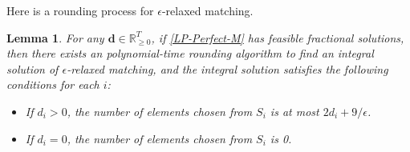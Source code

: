 \documentclass[11pt,a4paper]{article} \usepackage{enumitem}
\newcommand{\boldd}{\boldsymbol{d}}
\newtheorem{lemma}[theorem]{Lemma}
\theoremstyle{definition}
\begin{document}
Here is a rounding process for $\epsilon$-relaxed matching.

\begin{lemma} \label{lem:matching-2}
For any $\boldd\in \mathbb{R}^{T}_{\ge 0}$, if \ref{LP-Perfect-M} has feasible fractional solutions, then there exists an polynomial-time rounding algorithm to find an integral solution of $\epsilon$-relaxed matching, and the integral solution satisfies the following conditions for each $i$:

\begin{itemize}

\item If $d_i>0$, the number of elements chosen from $S_i$ is at most $2d_i+9/\epsilon$. 

\item If $d_i=0$, the number of elements chosen from $S_i$ is 0.
\end{itemize}
\end{lemma}
\end{document}
